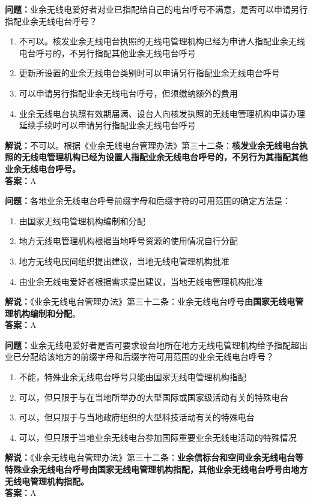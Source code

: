 \textbf{问题：}业余无线电爱好者对业已指配给自己的电台呼号不满意，是否可以申请另行指配业余无线电台呼号？
\begin{enumerate}[label=\Alph*), leftmargin=1cm]
	\item 不可以。核发业余无线电台执照的无线电管理机构已经为申请人指配业余无线电台呼号的，不另行指配其他业余无线电台呼号
	\item 更新所设置的业余无线电台类别时可以申请另行指配业余无线电台呼号
	\item 可以申请另行指配业余无线电台呼号，但须缴纳额外的费用
	\item 业余无线电台执照有效期届满、设台人向核发执照的无线电管理机构申请办理延续手续时可以申请另行指配业余无线电台呼号
\end{enumerate}
\textbf{解说：}不可以。根据《业余无线电台管理办法》第三十二条：\textbf{核发业余无线电台执照的无线电管理机构已经为设置人指配业余无线电台呼号的，不另行为其指配其他业余无线电台呼号。}\\\textbf{答案：}A

\textbf{问题：}各地业余无线电台呼号前缀字母和后缀字符的可用范围的确定方法是：
\begin{enumerate}[label=\Alph*), leftmargin=1cm]
	\item 由国家无线电管理机构编制和分配
	\item 地方无线电管理机构根据当地呼号资源的使用情况自行分配
	\item 地方无线电民间组织提出建议，当地无线电管理机构批准
	\item 由业余无线电爱好者根据需求提出建议，当地无线电管理机构批准
\end{enumerate}
\textbf{解说：}《业余无线电台管理办法》第三十二条：业余无线电台呼号\textbf{由国家无线电管理机构编制和分配}。\\\textbf{答案：}A

\textbf{问题：}业余无线电爱好者是否可要求设台地所在地方无线电管理机构给予指配超出业已分配给该地方的前缀字母和后缀字符可用范围的业余无线电台呼号？
\begin{enumerate}[label=\Alph*), leftmargin=1cm]
	\item 不能，特殊业余无线电台呼号只能由国家无线电管理机构指配
	\item 可以，但只限于与在当地所举办的大型国际或国家级活动有关的特殊电台
	\item 可以，但只限于与当地政府组织的大型科技活动有关的特殊电台
	\item 可以，但只限于当地业余无线电台参加国际重要业余无线电活动的特殊情况
\end{enumerate}
\textbf{解说：}《业余无线电台管理办法》第三十二条：\textbf{业余信标台和空间业余无线电台等特殊业余无线电台呼号由国家无线电管理机构指配，其他业余无线电台呼号由地方无线电管理机构指配。}\\\textbf{答案：}A

